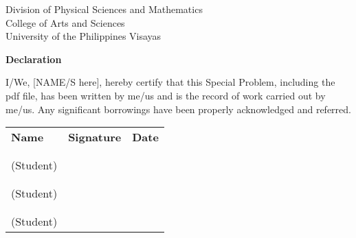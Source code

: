 \begin{center}
	Division of Physical Sciences and Mathematics\\
	College of Arts and Sciences\\
	University of the Philippines Visayas 
	
		\textbf{Declaration}
		\end{center}

I/We,  [NAME/S here], hereby certify that this Special Problem, including the pdf file, has been written by me/us  and is the record of work carried out by me/us. Any significant borrowings have been properly acknowledged and referred.

	\begin{tabular}{lll}
	\bfseries Name  & \bfseries Signature & \bfseries Date\\ \\
	\signaturerule &\signaturerule  & \signaturerule\\ 
	(Student)\\ \\
	\signaturerule &\signaturerule &\signaturerule\\
	(Student)\\ \\
	\signaturerule &\signaturerule &\signaturerule\\
	(Student)
\end{tabular}




